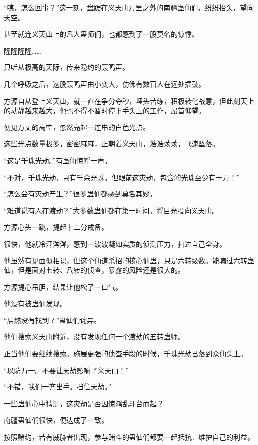 
\begin{this_body}

“咦，怎么回事？”这一刻，盘踞在义天山万里之外的南疆蛊仙们，纷纷抬头，望向天空。

甚至就连义天山上的凡人蛊师们，也都感到了一股莫名的惊悸。

隆隆隆隆……

只听从极高的天际，传来隐约的轰鸣声。

几个呼吸之后，这股轰鸣声由小变大，仿佛有数百人在远处擂鼓。

方源自从登上义天山，就一直在争分夺秒，埋头苦练，积极转化战意，但此刻天上的动静越来越大，他也不得不暂时停下手头上的工作，昂首仰望。

便见万丈的高空，忽然亮起一连串的白色光点。

这些光点数量极多，密密麻麻，正朝着义天山，浩浩荡荡，飞速坠落。

“这是千珠光劫。”有蛊仙惊呼一声。

“不对，千珠光劫，只有千余光珠。但眼前这灾劫，包含的光珠至少有十万！”

“怎么会有灾劫产生？”很多蛊仙都感到莫名其妙。

“难道说有人在渡劫？”大多数蛊仙都在第一时间，将目光投向义天山。

方源心头一跳，提起十二分戒备。

很快，他就冷汗涔涔，感到一波波凝如实质的侦测压力，扫过自己全身。

他虽然有见面似相识，但这个仙道杀招的核心仙蛊，只是六转级数。能骗过六转蛊仙，但是面对七转、八转的侦查，暴露的风险还是很大的。

方源提心吊胆，结果让他松了一口气。

他没有被蛊仙发现。

“居然没有找到？”蛊仙们诧异。

他们搜索义天山附近，没有发现任何一个渡劫的五转蛊师。

正当他们要继续搜索。施展更强的侦查手段的时候，千珠光劫已落到众仙头上。

“以防万一。不要让天劫影响了义天山！”

“不错，我们一齐出手。挡住天劫。”

一些蛊仙心中猜测，这灾劫是否因惊鸿乱斗台而起？

南疆蛊仙们很快，便达成了一致。

按照赌约，若有威胁者出现，参与赌斗的蛊仙们都要一起抵抗，维护自己的利益。


\end{this_body}
